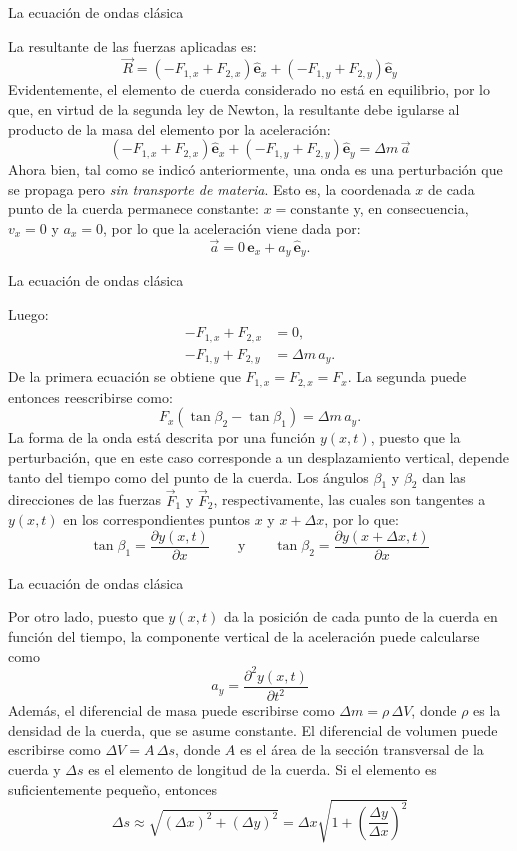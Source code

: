 \documentclass[11pt,handout,aspectratio=1610]{beamer}
\newcommand{\pdiff}[2]{\frac{\partial #1}{\partial #2}}
\newcommand{\pddiff}[2]{\frac{\partial^2 #1}{\partial #2^2}}
\newcommand{\ver}[1]{\hat{\mathbf{#1}}}
\begin{document}
\begin{frame}{La ecuación de ondas clásica}

    La resultante de las fuerzas aplicadas es: $$ \vec{R} = \left(-F_{1,x} + F_{2,x}\right) \ver{e}_x + \left(-F_{1,y} + F_{2,y}\right) \ver{e}_y $$ Evidentemente, el elemento de cuerda considerado no está en equilibrio, por lo que, en virtud de la segunda ley de Newton, la resultante debe igularse al producto de la masa del elemento por la aceleración: $$ \left(-F_{1,x} + F_{2,x}\right) \ver{e}_x + \left(-F_{1,y} + F_{2,y}\right) \ver{e}_y = \Delta m \, \vec{a} $$ Ahora bien, tal como se indicó anteriormente, una onda es una perturbación que se propaga pero \emph{sin transporte de materia}. Esto es, la coordenada $x$ de cada punto de la cuerda permanece constante: $x = \text{constante}$ y, en consecuencia, $v_x = 0$ y $a_x = 0$, por lo que la aceleración viene dada por: $$ \vec{a} = 0 \, \ver{e}_x + a_y \, \ver{e}_y.$$

\end{frame}

\begin{frame}{La ecuación de ondas clásica}

    Luego:
    \begin{align*}
        -F_{1,x} + F_{2,x} &= 0, \\
        -F_{1,y} + F_{2,y} &= \Delta m \, a_y.
    \end{align*} De la primera ecuación se obtiene que $F_{1,x} = F_{2,x} = F_x$. La segunda puede entonces reescribirse como: $$ F_x \left(\tan \beta_2 - \tan \beta_1\right) = \Delta m \, a_y. $$ La forma de la onda está descrita por una función $y(x,t)$, puesto que la perturbación, que en este caso corresponde a un desplazamiento vertical, depende tanto del tiempo como del punto de la cuerda. Los ángulos $\beta_1$ y $\beta_2$ dan las direcciones de las fuerzas $\vec{F}_1$ y $\vec{F}_2$, respectivamente, las cuales son tangentes a $y(x,t)$ en los correspondientes puntos $x$ y $x + \Delta x$, por lo que: $$ \tan \beta_1 = \pdiff{y \left(x,t\right)}{x}  \qquad \text{y} \qquad \tan \beta_2 = \pdiff{y \left(x+\Delta x,t\right)}{x}$$
\end{frame}

\begin{frame}{La ecuación de ondas clásica}

    Por otro lado, puesto que $y(x,t)$ da la posición de cada punto de la cuerda en función del tiempo, la componente vertical de la aceleración puede calcularse como $$a_y = \pddiff{y \left(x,t\right)}{t} $$ Además, el diferencial de masa puede escribirse como $\Delta m = \rho \, \Delta V$, donde $\rho$ es la densidad de la cuerda, que se asume constante. El diferencial de volumen puede escribirse como $\Delta V = A \, \Delta s$, donde $A$ es el área de la sección transversal de la cuerda y $\Delta s$ es el elemento de longitud de la cuerda. Si el elemento es suficientemente pequeño, entonces $$\Delta s \approx \sqrt{\left(\Delta x\right)^2 + \left(\Delta y\right)^2} = \Delta x \sqrt{1 + \left(\frac{\Delta y}{\Delta x}\right)^2} $$

\end{frame}
\end{document}
